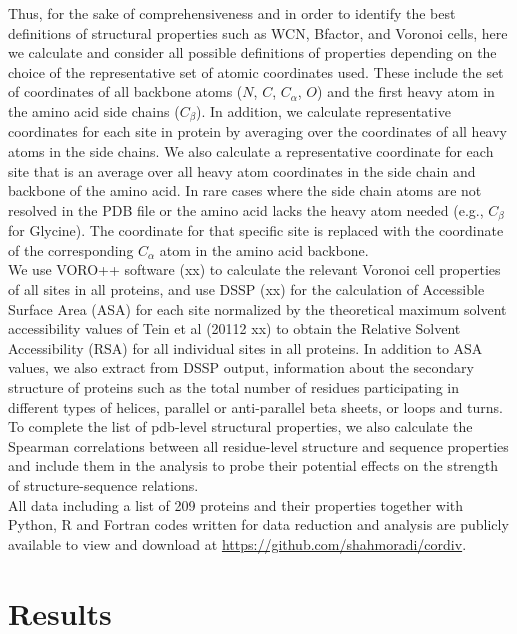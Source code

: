 \documentclass[11pt]{article}
\begin{document}
    Thus, for the sake of comprehensiveness and in order to identify the best definitions of structural properties such as WCN, Bfactor, and Voronoi cells, here we calculate and consider all possible definitions of properties depending on the choice of the representative set of atomic coordinates used. These include the set of coordinates of all backbone atoms ($N$, $C$, $C_\alpha$, $O$) and the first heavy atom in the amino acid side chains ($C_\beta$). In addition, we calculate representative coordinates for each site in protein by averaging over the coordinates of all heavy atoms in the side chains. We also calculate a representative coordinate for each site that is an average over all heavy atom coordinates in the side chain and backbone of the amino acid. In rare cases where the side chain atoms are not resolved in the PDB file or the amino acid lacks the heavy atom needed (e.g., $C_\beta$ for Glycine). The coordinate for that specific site is replaced with the coordinate of the corresponding $C_\alpha$ atom in the amino acid backbone.
    \\

    We use VORO++ software (xx) to calculate the relevant Voronoi cell properties of all sites in all proteins, and use DSSP (xx) for the calculation of Accessible Surface Area (ASA) for each site normalized by the theoretical maximum solvent accessibility values of Tein et al (20112 xx) to obtain the Relative Solvent Accessibility (RSA) for all individual sites in all proteins. In addition to ASA values, we also extract from DSSP output, information about the secondary structure of proteins such as the total number of residues participating in different types of helices, parallel or anti-parallel beta sheets, or loops and turns. To complete the list of pdb-level structural properties, we also calculate the Spearman correlations between all residue-level structure and sequence properties and include them in the analysis to probe their potential effects on the strength of structure-sequence relations.
    \\

    All data including a list of 209 proteins and their properties together with Python, R and Fortran codes written for data reduction and analysis are publicly available to view and download at \url{https://github.com/shahmoradi/cordiv}.


\section{Results}
\label{sec:results}
\end{document}
